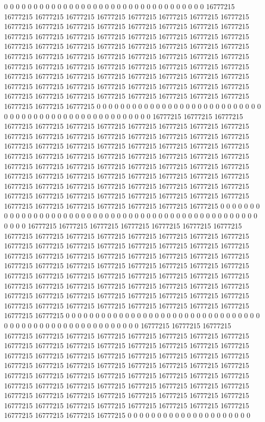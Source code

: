 0 0 0 0 0 0 0 0 0 0 0 0 0 0 0 0 0 0 0 0 0 0 0 0 0 0 0 0 0 0 0 0 0 0 16777215 16777215 16777215 16777215 16777215 16777215 16777215 16777215 16777215 16777215 16777215 16777215 16777215 16777215 16777215 16777215 16777215 16777215 16777215 16777215 16777215 16777215 16777215 16777215 16777215 16777215 16777215 16777215 16777215 16777215 16777215 16777215 16777215 16777215 16777215 16777215 16777215 16777215 16777215 16777215 16777215 16777215 16777215 16777215 16777215 16777215 16777215 16777215 16777215 16777215 16777215 16777215 16777215 16777215 16777215 16777215 16777215 16777215 16777215 16777215 16777215 16777215 16777215 16777215 16777215 16777215 16777215 16777215 16777215 16777215 16777215 16777215 16777215 16777215 16777215 16777215 0 0 0 0 0 0 0 0 0 0 0 0 0 0 0 0 0 0
0 0 0 0 0 0 0 0 0 0 0 0 0 0 0 0 0 0 0 0 0 0 0 0 0 0 0 0 0 0 0 0 0 0 0 16777215 16777215 16777215 16777215 16777215 16777215 16777215 16777215 16777215 16777215 16777215 16777215 16777215 16777215 16777215 16777215 16777215 16777215 16777215 16777215 16777215 16777215 16777215 16777215 16777215 16777215 16777215 16777215 16777215 16777215 16777215 16777215 16777215 16777215 16777215 16777215 16777215 16777215 16777215 16777215 16777215 16777215 16777215 16777215 16777215 16777215 16777215 16777215 16777215 16777215 16777215 16777215 16777215 16777215 16777215 16777215 16777215 16777215 16777215 16777215 16777215 16777215 16777215 16777215 16777215 16777215 16777215 16777215 16777215 16777215 16777215 16777215 16777215 16777215 0 0 0 0 0 0 0 0 0 0 0 0 0 0 0 0 0 0 0
0 0 0 0 0 0 0 0 0 0 0 0 0 0 0 0 0 0 0 0 0 0 0 0 0 0 0 0 0 0 0 0 0 0 0 16777215 16777215 16777215 16777215 16777215 16777215 16777215 16777215 16777215 16777215 16777215 16777215 16777215 16777215 16777215 16777215 16777215 16777215 16777215 16777215 16777215 16777215 16777215 16777215 16777215 16777215 16777215 16777215 16777215 16777215 16777215 16777215 16777215 16777215 16777215 16777215 16777215 16777215 16777215 16777215 16777215 16777215 16777215 16777215 16777215 16777215 16777215 16777215 16777215 16777215 16777215 16777215 16777215 16777215 16777215 16777215 16777215 16777215 16777215 16777215 16777215 16777215 16777215 16777215 16777215 16777215 16777215 16777215 16777215 16777215 16777215 16777215 16777215 0 0 0 0 0 0 0 0 0 0 0 0 0 0 0 0 0 0 0 0
0 0 0 0 0 0 0 0 0 0 0 0 0 0 0 0 0 0 0 0 0 0 0 0 0 0 0 0 0 0 0 0 0 0 0 0 16777215 16777215 16777215 16777215 16777215 16777215 16777215 16777215 16777215 16777215 16777215 16777215 16777215 16777215 16777215 16777215 16777215 16777215 16777215 16777215 16777215 16777215 16777215 16777215 16777215 16777215 16777215 16777215 16777215 16777215 16777215 16777215 16777215 16777215 16777215 16777215 16777215 16777215 16777215 16777215 16777215 16777215 16777215 16777215 16777215 16777215 16777215 16777215 16777215 16777215 16777215 16777215 16777215 16777215 16777215 16777215 16777215 16777215 16777215 16777215 16777215 16777215 16777215 16777215 16777215 16777215 16777215 16777215 16777215 16777215 16777215 0 0 0 0 0 0 0 0 0 0 0 0 0 0 0 0 0 0 0 0 0
